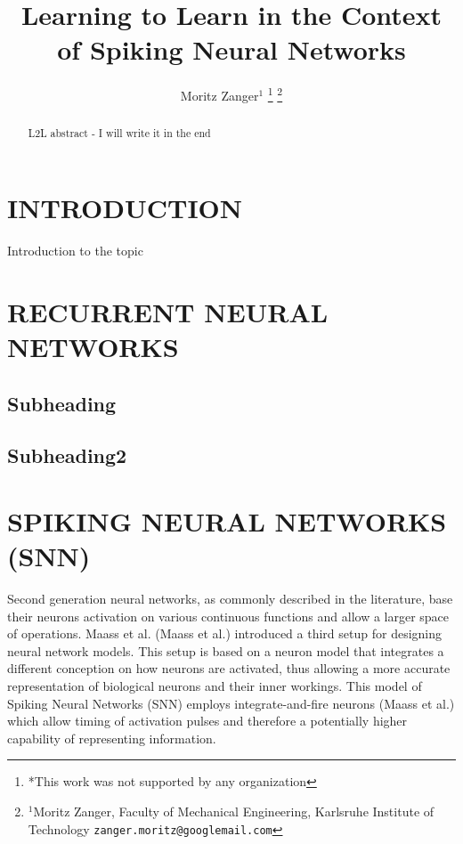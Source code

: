 \documentclass[letterpaper, 10 pt, conference]{ieeeconf}  %
\title{\LARGE \bf
Learning to Learn in the Context of Spiking Neural Networks
}
\author{Moritz Zanger$^{1}$ %
\thanks{*This work was not supported by any organization}%
\thanks{$^{1}$Moritz Zanger, Faculty of Mechanical Engineering, Karlsruhe Institute of Technology
        {\tt\small zanger.moritz@googlemail.com}}%
}
\begin{document}
\maketitle
\thispagestyle{empty}
\pagestyle{empty}


\begin{abstract}

L2L abstract - I will write it in the end

\end{abstract}


\section{INTRODUCTION}

Introduction to the topic

\section{RECURRENT NEURAL NETWORKS}

\subsection{Subheading}

\subsection{Subheading2}

\section{SPIKING NEURAL NETWORKS (SNN)}

Second generation neural networks, as commonly described in the literature, base their neurons activation on various continuous functions 
and allow a larger space of operations. Maass et al. (Maass et al.) introduced a third setup for 
designing neural network models. This setup is based on a neuron model that integrates a different conception on how neurons are activated,
thus allowing a more accurate representation of biological neurons and their inner workings. This model of Spiking Neural Networks (SNN) employs
integrate-and-fire neurons (Maass et al.) which allow timing of activation pulses and therefore a potentially higher capability of representing 
information. 
\end{document}
